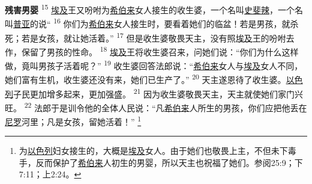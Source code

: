 \textbf{残害男婴\quad}
\textsuperscript{15}
\uline{埃及}王又吩咐为\uline{希伯来}女人接生的收生婆，一个名叫\uline{史斐辣}，一个名叫\uline{普亚}的说“
\textsuperscript{16}
你们为\uline{希伯来}女人接生时，要看着她们的临盆！若是男孩，就杀死；若是女孩，就让她活着。”
\textsuperscript{17}
但是收生婆敬畏天主，没有照\uline{埃及}王的吩咐去作，保留了男孩的性命。
\textsuperscript{18}
\uline{埃及}王将收生婆召来，问她们说：“你们为什么这样做，竟叫男孩子活着呢？”
\textsuperscript{19}
收生婆回答法郎说：“\uline{希伯来}女人与\uline{埃及}女人不同，她们富有生机，收生婆还没有来，她们已生产了。”
\textsuperscript{20}
天主遂恩待了收生婆。\uline{以色列}子民更加增多起来，更加强盛。
\textsuperscript{21}
因为收生婆敬畏天主，天主就使她们家门兴旺。
\textsuperscript{22}
法郎于是训令他的全体人民说：“凡\uline{希伯来}人所生的男孩，你们应把他丢在\uline{尼罗}河里；凡是女孩，留她活着！”
\footnote{为\uline{以色列}妇女接生的，大概是\uline{埃及}女人。由于她们也敬畏上主，不但未下毒手，反而保护了\uline{希伯来}人初生的男婴，所以天主也祝福了她们。参阅25:9；下7:11；上2:24。}
